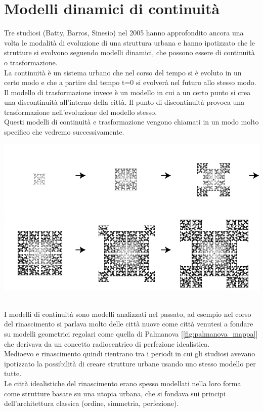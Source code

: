 \documentclass[a4paper,12pt, oneside]{book}
\begin{document}
  \section{Modelli dinamici di continuità}
  Tre studiosi (Batty, Barros, Sinesio) nel 2005 hanno approfondito ancora una volta le modalità di evoluzione di una struttura urbana e hanno ipotizzato che le strutture si evolvono seguendo modelli dinamici, che possono essere di continuità o trasformazione.\\
  La continuità è un sistema urbano che nel corso del tempo si è evoluto in un certo modo e che a partire dal tempo t=0 si evolverà nel futuro allo stesso modo.\\
  Il modello di trasformazione invece è un modello in cui a un certo punto si crea una discontinuità all'interno della città. Il punto di discontinuità provoca una trasformazione nell'evoluzione del modello stesso.\\
  Questi modelli di continuità e trasformazione vengono chiamati in un modo molto specifico che vedremo successivamente.\\
  \begin{center}
  	\includegraphics[width=0.6\linewidth]{"immagini/Modello urbano a sviluppo cellulare"}
  	\label{fig:modello urbano a sviluppo cellulare}
  \end{center}
  \leavevmode\\
  I modelli di continuità sono modelli analizzati nel passato, ad esempio nel corso del rinascimento si parlava molto delle città nuove come città venutesi a fondare su modelli geometrici regolari come quella di Palmanova [\ref{fig:palmanova_mappa}] che derivava da un concetto radiocentrico di perfezione idealistica.\\
  Medioevo e rinascimento quindi rientrano tra i periodi in cui gli studiosi avevano ipotizzato la possibilità di creare strutture urbane usando uno stesso modello per tutte.\\
  Le città idealistiche del rinascimento erano spesso modellati nella loro forma come strutture basate su una utopia urbana, che si fondava sui principi dell'architettura classica (ordine, simmetria, perfezione).\\
\end{document}
